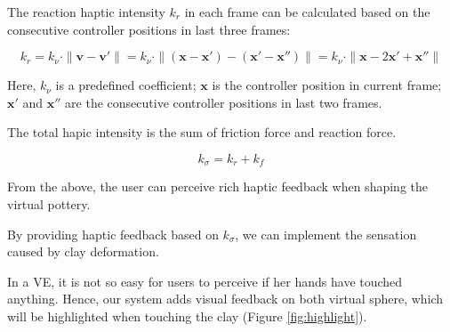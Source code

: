 \documentclass{svjour3}                     %
\begin{document}
The reaction haptic intensity $k_{r}$ in each frame can be calculated based on the consecutive controller positions in last three frames:

\begin{equation}
k_{r} = k_{\nu} \cdot \|\mathbf{v} - \mathbf{v}'\| = k_{\nu} \cdot \|(\mathbf{x}-\mathbf{x}') - (\mathbf{x}'-\mathbf{x}'')\| = k_{\nu} \cdot \|\mathbf{x}-2\mathbf{x}'+\mathbf{x}''\|
\end{equation}

Here, $k_{\nu}$ is a predefined coefficient; $\mathbf{x}$ is the controller position in current frame; $\mathbf{x}'$ and $\mathbf{x}''$ are the consecutive controller positions in last two frames.

The total hapic intensity is the sum of friction force and reaction force.

\begin{equation}
k_{\sigma} = k_{r} + k_{f}
\end{equation}

From the above, the user can perceive rich haptic feedback when shaping the virtual pottery.

By providing haptic feedback based on $k_{\sigma}$, we can implement the sensation caused by clay deformation.






In a VE, it is not so easy for users to perceive if her hands have touched anything. Hence, our system adds visual feedback on both virtual sphere, which will be highlighted when touching the clay (Figure \ref{fig:highlight}).
\end{document}
